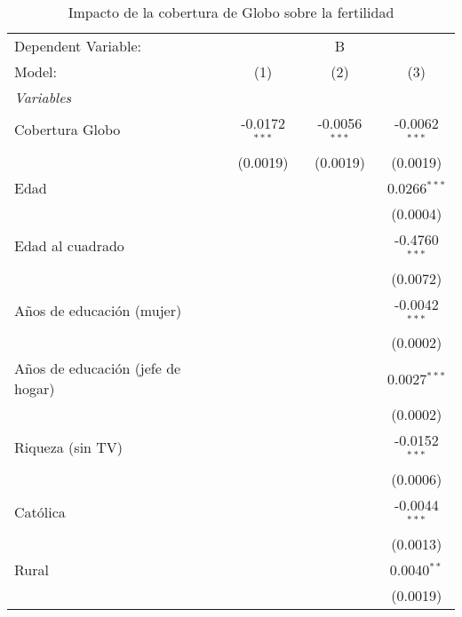
\begin{table}[htbp]
   \caption{Impacto de la cobertura de Globo sobre la fertilidad}
   \centering
   \begin{tabular}{lccc}
      \tabularnewline \midrule \midrule
      Dependent Variable: & \multicolumn{3}{c}{B}\\
      Model:                            & (1)             & (2)             & (3)\\  
      \midrule
      \emph{Variables}\\
      Cobertura Globo                   & -0.0172$^{***}$ & -0.0056$^{***}$ & -0.0062$^{***}$\\   
                                        & (0.0019)        & (0.0019)        & (0.0019)\\   
      Edad                              &                 &                 & 0.0266$^{***}$\\   
                                        &                 &                 & (0.0004)\\   
      Edad al cuadrado                  &                 &                 & -0.4760$^{***}$\\   
                                        &                 &                 & (0.0072)\\   
      Años de educación (mujer)         &                 &                 & -0.0042$^{***}$\\   
                                        &                 &                 & (0.0002)\\   
      Años de educación (jefe de hogar) &                 &                 & 0.0027$^{***}$\\   
                                        &                 &                 & (0.0002)\\   
      Riqueza (sin TV)                  &                 &                 & -0.0152$^{***}$\\   
                                        &                 &                 & (0.0006)\\   
      Católica                          &                 &                 & -0.0044$^{***}$\\   
                                        &                 &                 & (0.0013)\\   
      Rural                             &                 &                 & 0.0040$^{**}$\\   
                                        &                 &                 & (0.0019)\\   

\end{tabular}
\end{table}

